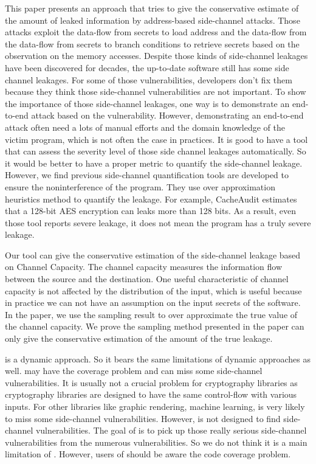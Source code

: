 This paper presents an approach that tries to give the conservative estimate of the amount of leaked information by address-based side-channel attacks. Those attacks exploit the data-flow from secrets to load address and the data-flow from the data-flow from secrets to branch conditions to retrieve secrets based on the observation on the memory accesses. Despite those kinds of side-channel leakages have been discovered for decades, the up-to-date software still has some side channel leakages. For some of those vulnerabilities, developers don't fix them because they think those side-channel vulnerabilities are not important. To show the importance of those side-channel leakages, one way is to demonstrate an end-to-end attack based on the vulnerability. However, demonstrating an end-to-end attack often need a lots of manual efforts and the domain knowledge of the victim program, which is not often the case in practices. It is good to have a tool that can assess the severity level of those side channel leakages automatically. So it would be better to have a proper metric to quantify the side-channel leakage. However, we find previous side-channel quantification tools are developed to  ensure the noninterference of the program. They use over approximation heuristics method to quantify the leakage. For example, CacheAudit estimates that a 128-bit AES encryption can leaks more than 128 bits. As a result, even those tool reports severe leakage, it does not mean the program has a truly severe leakage.

Our tool can give the conservative estimation of the side-channel leakage based on Channel Capacity. The channel capacity measures  the information flow between the source and the destination. One useful characteristic of channel capacity is not affected by the distribution of the input, which is useful because in practice we can not have an assumption on the input secrets of the software. In the paper, we use the sampling result to over approximate the true value of the channel capacity. We prove the sampling method presented in the paper can only give the conservative estimation of the amount of the true leakage.

\ctool{} is a dynamic approach. So it bears the same limitations of dynamic approaches as well. \ctool{} may have the coverage problem and can miss some side-channel vulnerabilities. It is usually not a crucial problem for cryptography libraries as cryptography libraries are designed to have the same control-flow with various inputs. For other libraries like graphic rendering, machine learning, \ctool{} is very likely to miss some side-channel vulnerabilities. However, \ctool{} is not designed to find side-channel vulnerabilities. The goal of \ctool{} is to pick up those really serious side-channel vulnerabilities from the numerous vulnerabilities. So we do not think it is a main limitation of \ctool{}. However, users of \ctool{} should be aware the code coverage problem.

